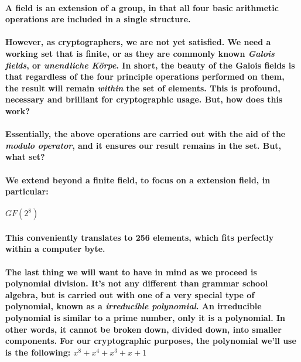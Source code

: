 \paragraph{A field is an extension of a group, in that all four basic arithmetic operations are included in a single structure.}\cite[p. 92]{PaarPelzl} 

\paragraph{However, as cryptographers, we are not yet satisfied. We need a working set that is finite, or as they are commonly known \emph{Galois fields}, or \emph{unendliche Körpe}. In short, the beauty of the Galois fields is that regardless of the four principle operations performed on them, the result will remain \emph{within} the set of elements. This is profound, necessary and brilliant for cryptographic usage. But, how does this work?}

\paragraph{Essentially, the above operations are carried out with the aid of the \emph{modulo operator}, and it ensures our result remains in the set. But, what set?}

\paragraph{We extend beyond a finite field, to focus on a extension field, in particular:}

$GF(2^8)$

\paragraph{This conveniently translates to 256 elements, which fits perfectly within a computer byte.}

\paragraph{The last thing we will want to have in mind as we proceed is polynomial division. It's not any different than grammar school algebra, but is carried out with one of a very special type of polynomial, known as a \emph{irreducible polynomial}. An irreducible polynomial is similar to a prime number, only it is a polynomial. In other words, it cannot be broken down, divided down, into smaller components. For our cryptographic purposes, the polynomial we'll use is the following: $x^8 + x^4 + x^3 + x + 1$}\cite[p.21]{DelfsKnebl}

